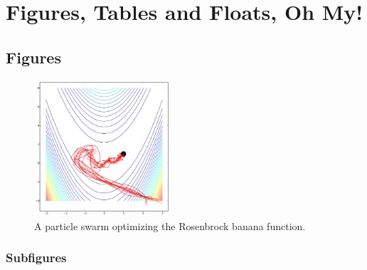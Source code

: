 \documentclass[master]{thesis}
\begin{document}
\chapter{Figures, Tables and Floats, Oh My!}

\section{Figures}

\begin{figure}[htp]
    \includegraphics[width=0.45\textwidth]{pso}
    \caption{A particle swarm optimizing the Rosenbrock banana function.}
    \label{fig:pso}
\end{figure}


\subsection{Subfigures}
\end{document}
